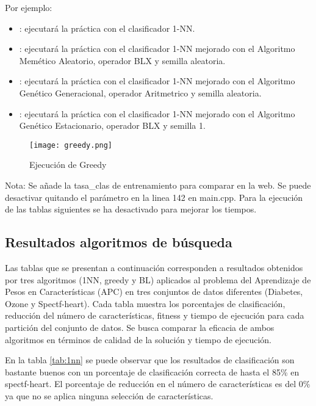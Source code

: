 Por ejemplo:
\begin{itemize}
	\item {}: ejecutará la práctica con el clasificador 1-NN.
	\item {}: ejecutará la práctica con el clasificador 1-NN mejorado con el Algoritmo Memético Aleatorio, operador BLX y semilla aleatoria.
	\item {}: ejecutará la práctica con el clasificador 1-NN mejorado con el Algoritmo Genético Generacional, operador Aritmetrico y semilla aleatoria.
	\item {}: ejecutará la práctica con el clasificador 1-NN mejorado con el Algoritmo Genético Estacionario, operador BLX y semilla 1.
\end{itemize}

\begin{figure}[h]
	\centering
	\texttt{[image: greedy.png]}
	\caption{Ejecución de Greedy}
	\label{fig:greedy}
\end{figure}
Nota: Se añade la tasa\_clas de entrenamiento para comparar en la web. Se puede desactivar quitando el parámetro  en la linea 142 en main.cpp. Para la ejecución de las tablas siguientes se ha desactivado para mejorar los tiempos. \\

\subsection{Resultados algoritmos de búsqueda}
Las tablas que se presentan a continuación corresponden a resultados obtenidos por tres algoritmos (1NN, greedy y BL) aplicados al problema del Aprendizaje de Pesos en Características (APC) en tres conjuntos de datos diferentes (Diabetes, Ozone y Spectf-heart). Cada tabla muestra los porcentajes de clasificación, reducción del número de características, fitness y tiempo de ejecución para cada partición del conjunto de datos. Se busca comparar la eficacia de ambos algoritmos en términos de calidad de la solución y tiempo de ejecución.



En la tabla \ref{tab:1nn} se puede observar que los resultados de clasificación son bastante buenos con un porcentaje de clasificación correcta de hasta el 85\% en spectf-heart. El porcentaje de reducción en el número de características es del 0\% ya que no se aplica ninguna selección de características.\\

